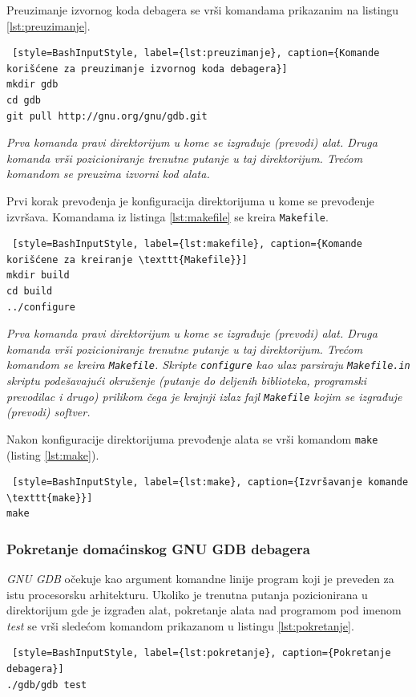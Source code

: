 \documentclass[12pt,oneside]{memoir}
\begin{document}
Preuzimanje izvornog koda debagera se vrši komandama prikazanim na listingu \ref{lst:preuzimanje}.
\begin{lstlisting} [style=BashInputStyle, label={lst:preuzimanje}, caption={Komande korišćene za preuzimanje izvornog koda debagera}]
mkdir gdb
cd gdb
git pull http://gnu.org/gnu/gdb.git

\end{lstlisting}

\emph{ Prva komanda pravi direktorijum u kome se izgrađuje (prevodi) alat. Druga komanda vrši pozicioniranje trenutne putanje u taj direktorijum. Trećom komandom se preuzima izvorni kod alata.}\newpage

Prvi korak prevođenja je konfiguracija direktorijuma u kome se prevođenje izvršava. Komandama iz listinga \ref{lst:makefile} se kreira \texttt{Makefile}.
\begin{lstlisting} [style=BashInputStyle, label={lst:makefile}, caption={Komande korišćene za kreiranje \texttt{Makefile}}]
mkdir build
cd build
../configure

\end{lstlisting}
\emph{Prva komanda pravi direktorijum u kome se izgrađuje (prevodi) alat. Druga komanda vrši pozicioniranje trenutne putanje u taj direktorijum. Trećom komandom se kreira \texttt{Makefile}. Skripte \texttt{configure} kao ulaz parsiraju \texttt{Makefile.in} skriptu podešavajući okruženje (putanje do deljenih biblioteka, programski prevodilac i drugo) prilikom čega je krajnji izlaz fajl \texttt{Makefile} kojim se izgrađuje (prevodi) softver.}

Nakon konfiguracije direktorijuma prevođenje alata se vrši komandom \texttt{make} (listing \ref{lst:make}).
\begin{lstlisting} [style=BashInputStyle, label={lst:make}, caption={Izvršavanje komande \texttt{make}}]
make
\end{lstlisting}

\subsubsection{Pokretanje domaćinskog GNU GDB debagera}

\emph{GNU GDB} očekuje kao argument komandne linije program koji je preveden za istu procesorsku arhitekturu. Ukoliko je trenutna putanja pozicionirana u direktorijum gde je izgrađen alat, pokretanje alata nad programom pod imenom \emph{test} se vrši sledećom komandom prikazanom u listingu \ref{lst:pokretanje}.
\begin{lstlisting} [style=BashInputStyle, label={lst:pokretanje}, caption={Pokretanje debagera}]
./gdb/gdb test

\end{lstlisting}
\end{document}
